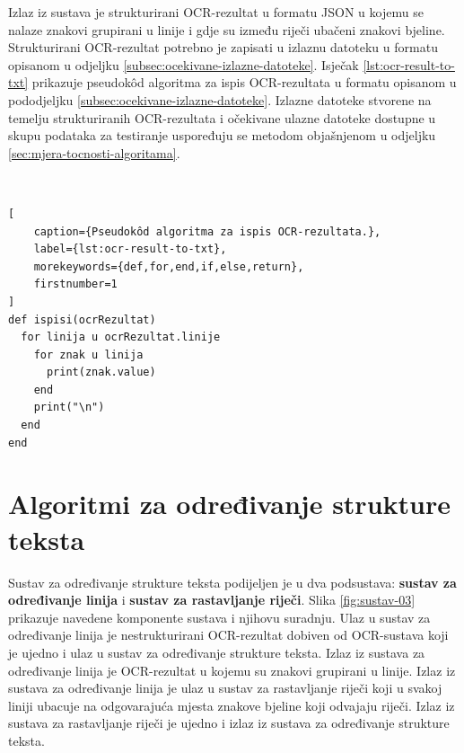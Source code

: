\documentclass[times, utf8, zavrsni]{fer}
\begin{document}
\pagebreak

Izlaz iz sustava je strukturirani OCR-rezultat u
formatu JSON u kojemu se nalaze znakovi grupirani u linije i gdje su između
riječi ubačeni znakovi bjeline. Strukturirani OCR-rezultat potrebno je zapisati
u izlaznu datoteku u formatu opisanom u odjeljku
\ref{subsec:ocekivane-izlazne-datoteke}. Isječak \ref{lst:ocr-result-to-txt}
prikazuje pseudokôd algoritma za ispis OCR-rezultata u formatu opisanom u
pododjeljku \ref{subsec:ocekivane-izlazne-datoteke}. Izlazne datoteke stvorene
na temelju strukturiranih OCR-rezultata i očekivane ulazne datoteke dostupne u
skupu podataka za testiranje uspoređuju se metodom objašnjenom u odjeljku
\ref{sec:mjera-tocnosti-algoritama}.

\

\begin{lstlisting}[
    caption={Pseudokôd algoritma za ispis OCR-rezultata.},
    label={lst:ocr-result-to-txt},
    morekeywords={def,for,end,if,else,return},
    firstnumber=1
]
def ispisi(ocrRezultat)
  for linija u ocrRezultat.linije
    for znak u linija
      print(znak.value)
    end
    print("\n")
  end
end
\end{lstlisting}

















\chapter{Algoritmi za određivanje strukture teksta}
\label{chap:algoritmi-za-odredivanje-strukture-teksta}
Sustav za određivanje strukture teksta podijeljen je u dva podsustava:
\textbf{sustav za određivanje linija} i \textbf{sustav za rastavljanje riječi}.
Slika \ref{fig:sustav-03} prikazuje navedene komponente sustava i njihovu
suradnju. Ulaz u sustav za određivanje linija je nestrukturirani OCR-rezultat
dobiven od OCR-sustava koji je ujedno i ulaz u sustav za određivanje strukture
teksta. Izlaz iz sustava za određivanje linija je OCR-rezultat
u kojemu su znakovi grupirani u linije. Izlaz iz sustava za određivanje linija
je ulaz u sustav za rastavljanje riječi koji u svakoj liniji ubacuje na
odgovarajuća mjesta znakove bjeline koji odvajaju riječi. Izlaz iz sustava za
rastavljanje riječi je ujedno i izlaz iz sustava za određivanje strukture
teksta.
\end{document}
